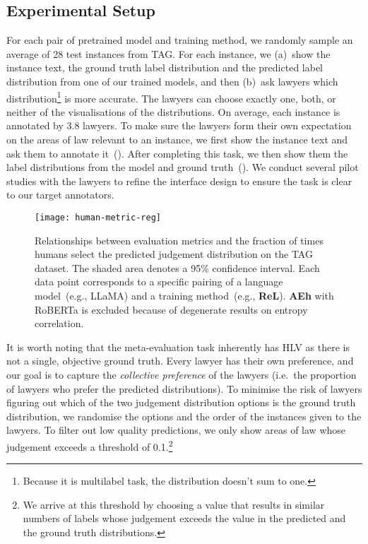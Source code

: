 \documentclass[shortpaper]{clv2025}
\newcommand{\methname}[1]{\textbf{#1}}  %
\begin{document}
\subsection{Experimental Setup}

For each pair of pretrained model and training method, we randomly
sample an average of 28 test instances from TAG. For each instance,
we (a)~show the instance text, the ground truth label distribution and the predicted
label distribution from one of our trained models, and then (b)~ask lawyers which distribution\footnote{Because
  it is multilabel task, the distribution doesn't sum to
  one.} is more accurate. The lawyers can choose exactly one, both, or neither
of the visualisations of the distributions. On average, each instance is annotated by 3.8 lawyers.
To make sure the lawyers form their own expectation on the areas of law
relevant to an instance, we first show the instance text and ask them to
annotate it~(). After completing this task, we then show
them the label distributions from the model and ground
truth~(). We conduct several pilot studies with the lawyers
to refine the interface design to ensure the task is clear to our target annotators.

\begin{figure}
  \centering
  \texttt{[image: human-metric-reg]}
  \caption{Relationships between evaluation metrics and the fraction of times
    humans select the predicted judgement distribution on the TAG dataset. The
    shaded area denotes a 95\% confidence interval. Each data point corresponds to
    a specific pairing of a language model~(e.g., LLaMA) and a training
    method~(e.g., \methname{ReL}). \methname{AEh} with RoBERTa is excluded
    because of degenerate results on entropy
    correlation.}\label{fig:rel-human-metric}
\end{figure}

It is worth noting that the meta-evaluation task inherently has HLV as there is
not a single, objective ground truth. Every lawyer has their own preference, and
our goal is to capture the \textit{collective preference} of the lawyers (i.e.\
the proportion of lawyers who prefer the predicted distributions).
To minimise the risk of lawyers figuring out which of the two judgement
distribution options is the ground truth distribution, we randomise the options
and the order of the instances given to the lawyers. To filter out low quality
predictions, we only show areas of law whose judgement exceeds a threshold of
\num{0.1}.\footnote{We arrive at this threshold by choosing a value that results
  in similar numbers of labels whose judgement exceeds the value in the
  predicted and the ground truth distributions.}
\end{document}
